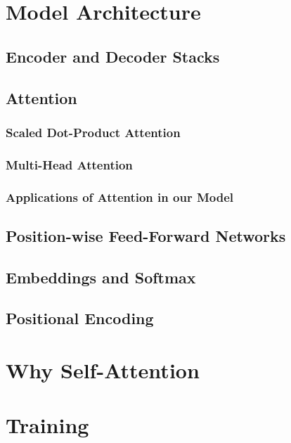 \documentclass[twocolumn]{jarticle}     %
\begin{document}
\section{Model Architecture}

\subsection{Encoder and Decoder Stacks}

\subsection{Attention}

\subsubsection{Scaled Dot-Product Attention}

\subsubsection{Multi-Head Attention}

\subsubsection{Applications of Attention in our Model}

\subsection{Position-wise Feed-Forward Networks}

\subsection{Embeddings and Softmax}

\subsection{Positional Encoding}

\section{Why Self-Attention}

\section{Training}
\end{document}
